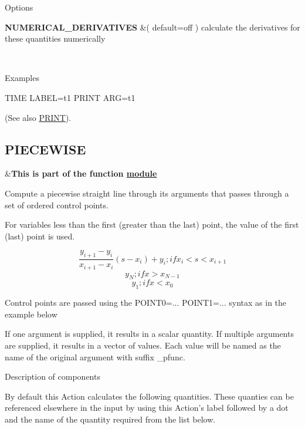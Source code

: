 \begin{DoxyParagraph}{Options}

\end{DoxyParagraph}
\begin{TabularC}{2}
\hline
{\bfseries  N\+U\+M\+E\+R\+I\+C\+A\+L\+\_\+\+D\+E\+R\+I\+V\+A\+T\+I\+V\+E\+S } &( default=off ) calculate the derivatives for these quantities numerically  

\\
\end{TabularC}


\begin{DoxyParagraph}{Examples}

\end{DoxyParagraph}
\begin{DoxyVerb}TIME            LABEL=t1
PRINT ARG=t1
\end{DoxyVerb}
 (See also \hyperlink{PRINT}{P\+R\+I\+N\+T}). \hypertarget{PIECEWISE}{}\subsection{P\+I\+E\+C\+E\+W\+I\+S\+E}\label{PIECEWISE}
\begin{TabularC}{2}
\hline
&{\bfseries  This is part of the function \hyperlink{mymodules}{module }}   \\
\end{TabularC}
Compute a piecewise straight line through its arguments that passes through a set of ordered control points.

For variables less than the first (greater than the last) point, the value of the first (last) point is used.

\[ \frac{y_{i+1}-y_i}{x_{i+1}-x_i}(s-x_i)+y_i ; if x_i<s<x_{i+1} \] \[ y_N ; if x>x_{N-1} \] \[ y_1 ; if x<x_0 \]

Control points are passed using the P\+O\+I\+N\+T0=... P\+O\+I\+N\+T1=... syntax as in the example below

If one argument is supplied, it results in a scalar quantity. If multiple arguments are supplied, it results in a vector of values. Each value will be named as the name of the original argument with suffix \+\_\+pfunc.

\begin{DoxyParagraph}{Description of components}

\end{DoxyParagraph}
By default this Action calculates the following quantities. These quanties can be referenced elsewhere in the input by using this Action's label followed by a dot and the name of the quantity required from the list below.

